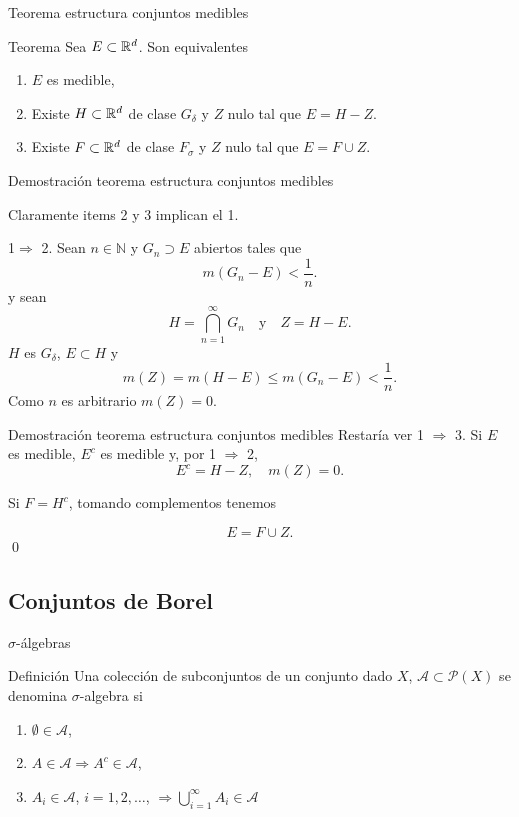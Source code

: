 Teorema estructura conjuntos medibles

{Teorema}
 Sea $E\subset\mathbb{R}^d$. Son equivalentes
 \begin{enumerate}
  \item $E$ es medible,
  \item Existe $H\subset\mathbb{R}^d$ de clase $G_{\delta}$ y $Z$ nulo tal que $E=H- Z$.
  \item Existe $F\subset\mathbb{R}^d$ de clase $F_{\sigma}$ y $Z$ nulo tal que $E=F\cup Z$.
  
 \end{enumerate}





    


Demostración teorema estructura conjuntos medibles

Claramente items 2 y 3 implican el 1.


1$\Rightarrow$ 2. Sean $n\in\mathbb{N}$ y  $G_n\supset E$ abiertos tales que
\[m(G_n-E)<\frac{1}{n}.\]
y sean 
\[H=\bigcap_{n=1}^{\infty} G_n\quad\text{y}\quad Z=H-E.\]
$H$ es $G_{\delta}$, $E\subset H$  y
\[m(Z)=m(H-E)\leq m(G_n-E)<\frac{1}{n}.\]
Como $n$ es arbitrario $m(Z)=0$. 


Demostración teorema estructura conjuntos medibles
Restaría ver 1 $\Rightarrow$ 3. Si $E$ es medible, $E^c$ es medible y, por 1 $\Rightarrow$ 2, 
\[E^c=H-Z,\quad m(Z)=0.\]

Si $F=H^c$, tomando complementos tenemos

\[E=F\cup Z.\]
\qed




    


\subsection{Conjuntos de Borel}
$\sigma$-álgebras

{Definición}
 Una colección de subconjuntos de un conjunto dado $X$,  $\mathscr{A}\subset\mathcal{P}(X)$ se denomina $\sigma$-algebra si
 \begin{enumerate}
  \item $\emptyset\in\mathscr{A}$,
  \item $A\in \mathscr{A}\Rightarrow A^c\in\mathscr{A}$,
  \item $A_i\in \mathscr{A}$, $i=1,2,\ldots$, $\Rightarrow \bigcup_{i=1}^{\infty}A_i\in\mathscr{A}$
 \end{enumerate}



